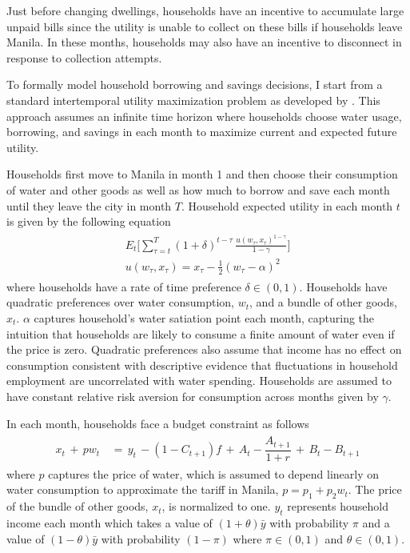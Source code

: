 \documentclass[12pt]{article}
\begin{document}
Just before changing dwellings, households have an incentive to accumulate large unpaid bills since the utility is unable to collect on these bills if households leave Manila.  In these months, households may also have an incentive to disconnect in response to collection attempts.

To formally model household borrowing and savings decisions, I start from a standard intertemporal utility maximization problem as developed by \cite{deaton1991saving}.  This approach assumes an infinite time horizon where households choose water usage, borrowing, and savings in each month to maximize current and expected future utility.  

Households first move to Manila in month 1 and then choose their consumption of water and other goods as well as how much to borrow and save each month until they leave the city in month $T$.  Household expected utility in each month $t$ is given by the following equation
\begin{align}\label{eq:u}
\begin{split}
E_t \Big[ \sum_{\tau = t}^{T} (1+\delta)^{t-\tau} \,\frac{u(w_{\tau},x_{\tau})^{1-\gamma}}{1-\gamma}   \Big]\\
u(w_{\tau},x_{\tau}) =  x_{\tau} -  \frac{1}{2} (w_{\tau} - \alpha)^2
\end{split} 
\end{align}
where households have a rate of time preference $\delta \in (0,1)$.  Households have quadratic preferences over water consumption, $w_{t}$, and a bundle of other goods, $x_{t}$.  $\alpha$ captures household's water satiation point each month, capturing the intuition that households are likely to consume a finite amount of water even if the price is zero.  Quadratic preferences also assume that income has no effect on consumption consistent with descriptive evidence that fluctuations in household employment are uncorrelated with water spending.  Households are assumed to have constant relative risk aversion for consumption across months given by $\gamma$.


In each month, households face a budget constraint as follows
\begin{align}\label{eq:bc}
\begin{split}
x_t \, + \, p w_t \, &= \, y_t \, - (1-C_{t+1})f  \, + \,  A_t  - \dfrac{A_{t+1}}{1+r}   \, + \,  B_t - B_{t+1} 
\end{split}
\end{align}
where $p$ captures the price of water, which is assumed to depend linearly on water consumption to approximate the tariff in Manila, $p=p_1+p_2w_t$.   The price of the bundle of other goods, $x_t$, is normalized to one.  $y_t$ represents household income each month which takes a value of $(1+\theta)\bar{y}$ with probability $\pi$ and a value of $(1-\theta)\bar{y}$ with probability $(1-\pi)$ where $\pi \in (0,1)$ and $\theta  \in (0,1)$.  
\end{document}
